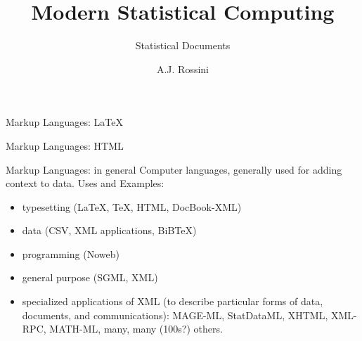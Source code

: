 \documentclass[pdf,final,azure]{prosper}
\title{Modern Statistical Computing}
\subtitle{Statistical Documents}
\author{A.J. Rossini}
\begin{document}
\maketitle 



\begin{slide}{Markup Languages: \LaTeX{}}
  
\end{slide}

\begin{slide}{Markup Languages: HTML}
  
\end{slide}


\begin{slide}{Markup Languages: in general}
  Computer languages, generally used for adding context to
  data. Uses and Examples:
  \begin{itemize}
  \item typesetting (\LaTeX{}, \TeX{}, HTML, DocBook-XML)
  \item data (CSV, XML applications, BiBTeX)
  \item programming (Noweb)
  \item general purpose (SGML, XML)
  \item specialized applications of XML (to describe particular forms
    of data, documents, and communications): MAGE-ML, StatDataML,
    XHTML, XML-RPC, MATH-ML, many, many (100s?) others.
\end{itemize}
\end{slide}
\end{document}
